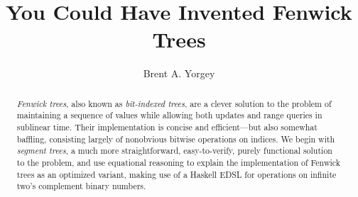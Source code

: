 \documentclass{jfp}
\theoremstyle{definition}
\theoremstyle{remark}
\begin{document}


\title{You Could Have Invented Fenwick Trees}
\begin{authgrp}
  \author{Brent A. Yorgey}
\end{authgrp}

\begin{abstract}
  \emph{Fenwick trees}, also known as \emph{bit-indexed trees}, are a
  clever solution to the problem of maintaining a sequence of values
  while allowing both updates and range queries in sublinear time.
  Their implementation is concise and efficient---but also somewhat
  baffling, consisting largely of nonobvious bitwise operations on
  indices.  We begin with \emph{segment trees}, a much more
  straightforward, easy-to-verify, purely functional solution to the
  problem, and use equational reasoning to explain the implementation
  of Fenwick trees as an optimized variant, making use of a Haskell
  EDSL for operations on infinite two's complement binary numbers.
\end{abstract}





\end{document}
